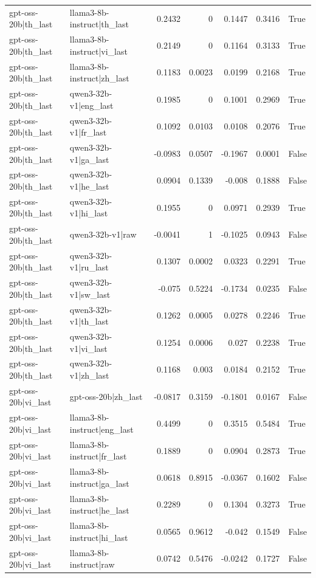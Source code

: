 \begin{table}
\begin{tabular}{l l r r r r l}
gpt-oss-20b|th_last & llama3-8b-instruct|th_last & 0.2432 & 0 & 0.1447 & 0.3416 & True \\
gpt-oss-20b|th_last & llama3-8b-instruct|vi_last & 0.2149 & 0 & 0.1164 & 0.3133 & True \\
gpt-oss-20b|th_last & llama3-8b-instruct|zh_last & 0.1183 & 0.0023 & 0.0199 & 0.2168 & True \\
gpt-oss-20b|th_last & qwen3-32b-v1|eng_last & 0.1985 & 0 & 0.1001 & 0.2969 & True \\
gpt-oss-20b|th_last & qwen3-32b-v1|fr_last & 0.1092 & 0.0103 & 0.0108 & 0.2076 & True \\
gpt-oss-20b|th_last & qwen3-32b-v1|ga_last & -0.0983 & 0.0507 & -0.1967 & 0.0001 & False \\
gpt-oss-20b|th_last & qwen3-32b-v1|he_last & 0.0904 & 0.1339 & -0.008 & 0.1888 & False \\
gpt-oss-20b|th_last & qwen3-32b-v1|hi_last & 0.1955 & 0 & 0.0971 & 0.2939 & True \\
gpt-oss-20b|th_last & qwen3-32b-v1|raw & -0.0041 & 1 & -0.1025 & 0.0943 & False \\
gpt-oss-20b|th_last & qwen3-32b-v1|ru_last & 0.1307 & 0.0002 & 0.0323 & 0.2291 & True \\
gpt-oss-20b|th_last & qwen3-32b-v1|sw_last & -0.075 & 0.5224 & -0.1734 & 0.0235 & False \\
gpt-oss-20b|th_last & qwen3-32b-v1|th_last & 0.1262 & 0.0005 & 0.0278 & 0.2246 & True \\
gpt-oss-20b|th_last & qwen3-32b-v1|vi_last & 0.1254 & 0.0006 & 0.027 & 0.2238 & True \\
gpt-oss-20b|th_last & qwen3-32b-v1|zh_last & 0.1168 & 0.003 & 0.0184 & 0.2152 & True \\
gpt-oss-20b|vi_last & gpt-oss-20b|zh_last & -0.0817 & 0.3159 & -0.1801 & 0.0167 & False \\
gpt-oss-20b|vi_last & llama3-8b-instruct|eng_last & 0.4499 & 0 & 0.3515 & 0.5484 & True \\
gpt-oss-20b|vi_last & llama3-8b-instruct|fr_last & 0.1889 & 0 & 0.0904 & 0.2873 & True \\
gpt-oss-20b|vi_last & llama3-8b-instruct|ga_last & 0.0618 & 0.8915 & -0.0367 & 0.1602 & False \\
gpt-oss-20b|vi_last & llama3-8b-instruct|he_last & 0.2289 & 0 & 0.1304 & 0.3273 & True \\
gpt-oss-20b|vi_last & llama3-8b-instruct|hi_last & 0.0565 & 0.9612 & -0.042 & 0.1549 & False \\
gpt-oss-20b|vi_last & llama3-8b-instruct|raw & 0.0742 & 0.5476 & -0.0242 & 0.1727 & False \\

\end{tabular}
\end{table}
